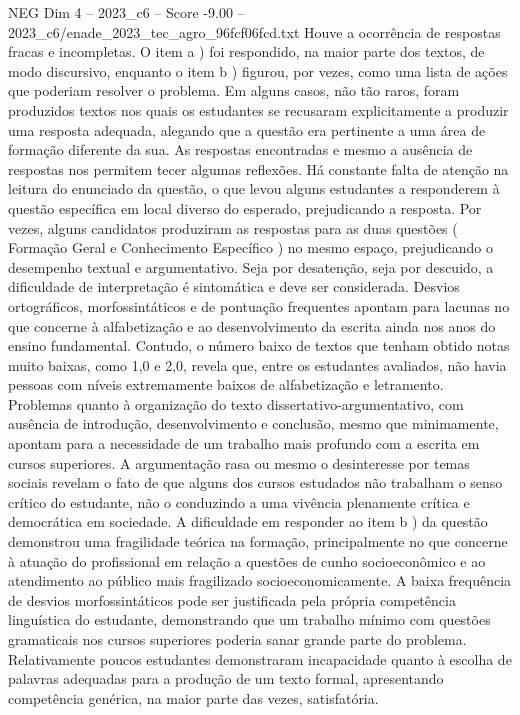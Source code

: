 \begin{textsample}{NEG Dim 4 – 2023\_c6 – Score -9.00 – 2023\_c6/enade\_2023\_tec\_agro\_96fcf06fcd.txt}
Houve a ocorrência de respostas fracas e incompletas.
O item a ) foi respondido, na maior parte dos textos, de modo discursivo, enquanto o item b ) figurou, por vezes, como uma lista de ações que poderiam resolver o problema.
Em alguns casos, não tão raros, foram produzidos textos nos quais os estudantes se recusaram explicitamente a produzir uma resposta adequada, alegando que a questão era pertinente a uma área de formação diferente da sua.
As respostas encontradas e mesmo a ausência de respostas nos permitem tecer algumas reflexões.
Há constante falta de atenção na leitura do enunciado da questão, o que levou alguns estudantes a responderem à questão específica em local diverso do esperado, prejudicando a resposta.
Por vezes, alguns candidatos produziram as respostas para as duas questões ( Formação Geral e Conhecimento Específico ) no mesmo espaço, prejudicando o desempenho textual e argumentativo.
Seja por desatenção, seja por descuido, a dificuldade de interpretação é sintomática e deve ser considerada.
Desvios ortográficos, morfossintáticos e de pontuação frequentes apontam para lacunas no que concerne à alfabetização e ao desenvolvimento da escrita ainda nos anos do ensino fundamental.
Contudo, o número baixo de textos que tenham obtido notas muito baixas, como 1,0 e 2,0, revela que, entre os estudantes avaliados, não havia pessoas com níveis extremamente baixos de alfabetização e letramento.
Problemas quanto à organização do texto dissertativo-argumentativo, com ausência de introdução, desenvolvimento e conclusão, mesmo que minimamente, apontam para a necessidade de um trabalho mais profundo com a escrita em cursos superiores.
A argumentação rasa ou mesmo o desinteresse por temas sociais revelam o fato de que alguns dos cursos estudados não trabalham o senso crítico do estudante, não o conduzindo a uma vivência plenamente crítica e democrática em sociedade.
A dificuldade em responder ao item b ) da questão demonstrou uma fragilidade teórica na formação, principalmente no que concerne à atuação do profissional em relação a questões de cunho socioeconômico e ao atendimento ao público mais fragilizado socioeconomicamente.
A baixa frequência de desvios morfossintáticos pode ser justificada pela própria competência linguística do estudante, demonstrando que um trabalho mínimo com questões gramaticais nos cursos superiores poderia sanar grande parte do problema.
Relativamente poucos estudantes demonstraram incapacidade quanto à escolha de palavras adequadas para a produção de um texto formal, apresentando competência genérica, na maior parte das vezes, satisfatória.

\end{textsample}
